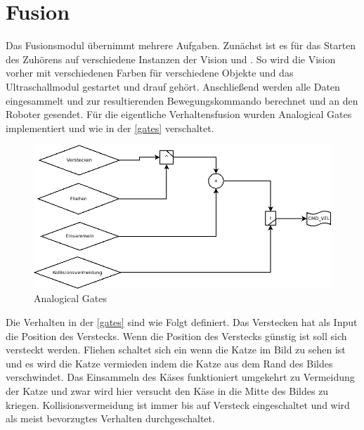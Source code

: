\documentclass[11pt,a4paper]{article}
\begin{document}
\section{Fusion}
Das Fusionsmodul übernimmt mehrere Aufgaben. Zunächst ist es für das Starten des Zuhörens auf verschiedene Instanzen der Vision und . So wird die Vision vorher mit verschiedenen Farben für verschiedene Objekte und das Ultraschallmodul gestartet und drauf gehört. Anschließend werden alle Daten eingesammelt und zur resultierenden Bewegungskommando berechnet und an den Roboter gesendet. Für die eigentliche Verhaltensfusion wurden Analogical Gates\cite{gates} implementiert und wie in der \autoref{gates} verschaltet. 
\begin{figure}[H]
\centering
\includegraphics[scale=0.5]{media/gates.png}
\caption{Analogical Gates}\label{gates}
\end{figure}
Die Verhalten in der \autoref{gates} sind wie Folgt definiert. Das Verstecken hat als Input die Position des Verstecks. Wenn die Position des Verstecks günstig ist soll sich versteckt werden. Fliehen schaltet sich ein wenn die Katze im Bild zu sehen ist und es wird die Katze vermieden indem die Katze aus dem Rand des Bildes verschwindet. Das Einsammeln des Käses funktioniert umgekehrt zu Vermeidung der Katze und zwar wird hier versucht den Käse in die Mitte des Bildes zu kriegen. Kollisionsvermeidung ist immer bis auf Versteck eingeschaltet und wird als meist bevorzugtes Verhalten durchgeschaltet. 
\end{document}
